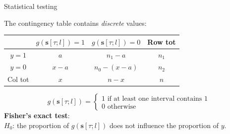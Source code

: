 \documentclass[aspectratio=32, 10pt]{beamer}
\begin{document}
\begin{frame}[fragile]{Statistical testing}

The contingency table contains \textit{discrete} values: 
\begin{table}
    \begin{tabular}{cccc}
    \toprule
    & $g(\mathbf{s}[\tau ;l]) = 1$ & $g(\mathbf{s}[\tau ;l]) = 0$ & Row tot \\
    \midrule
    $y=1$ & $a$ & $n_1-a$ & $n_1$ \\
    $y=0$ & $x - a$ & $n_0-(x - a)$ & $n_2$ \\
    Col tot & $x$ & $n-x$ & $n$\\
    \bottomrule
    \end{tabular}
\end{table}

\begin{equation}
 g(\mathbf{s}[\tau ;l]) =
 \begin{cases}
 1 \text{ if at least one interval contains 1}\\
 0 \text{ otherwise}
 \end{cases}
\end{equation}
\vspace{12pt}
\textbf{Fisher's exact test}:\\
$H_0$: the proportion of $g(\mathbf{s}[\tau ;l])$ does not influence the proportion of $y$.\\
\vspace{12pt}
\end{frame}
\end{document}
